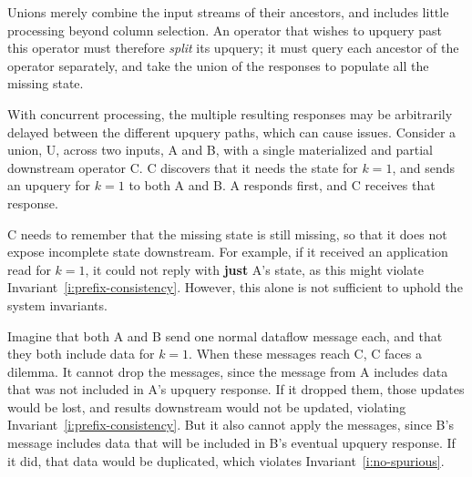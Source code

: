 Unions merely combine the input streams of their ancestors, and includes little
processing beyond column selection. An operator that wishes to upquery past this
operator must therefore \emph{split} its upquery; it must query each ancestor of
the operator separately, and take the union of the responses to populate all the
missing state.

With concurrent processing, the multiple resulting responses may be arbitrarily
delayed between the different upquery paths, which can cause issues. Consider
a union, U, across two inputs, A and B, with a single materialized and partial
downstream operator C. C discovers that it needs the state for $k = 1$, and
sends an upquery for $k = 1$ to both A and B. A responds first, and C receives
that response.

C needs to remember that the missing state is still missing, so that it does not
expose incomplete state downstream. For example, if it received an application
read for $k = 1$, it could not reply with \textbf{just} A's state, as this might
violate Invariant~\ref{i:prefix-consistency}. However, this alone is not
sufficient to uphold the system invariants.

Imagine that both A and B send one normal dataflow message each, and that they
both include data for $k = 1$. When these messages reach C, C faces a dilemma.
It cannot drop the messages, since the message from A includes data that was not
included in A's upquery response. If it dropped them, those updates would be
lost, and results downstream would not be updated, violating
Invariant~\ref{i:prefix-consistency}. But it also cannot apply the messages,
since B's message includes data that will be included in B's eventual upquery
response. If it did, that data would be duplicated, which violates
Invariant~\ref{i:no-spurious}.

